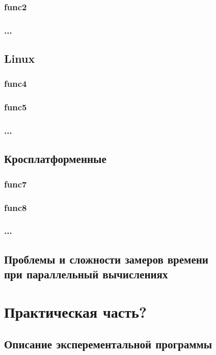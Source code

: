 \documentclass{article}
\begin{document}
			\subsubsection{func2}
			\subsubsection{...}
		\subsection{Linux}
			\subsubsection{func4}
			\subsubsection{func5}
			\subsubsection{...}
		\subsection{Кросплатформенные}
			\subsubsection{func7}
			\subsubsection{func8}
			\subsubsection{...}
		\subsection{Проблемы и сложности замеров времени \\ при параллельный вычислениях}
	\newpage
	\section{Практическая часть?}
		\subsection{Описание эксперементальной программы}
\end{document}
